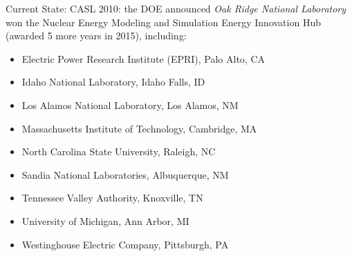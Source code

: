 \documentclass[xcolor=x11names]{beamer}
\begin{document}
%
%


\begin{frame}{Current State: CASL}
2010: the DOE announced \emph{Oak Ridge National Laboratory} won the Nuclear Energy Modeling and Simulation Energy Innovation Hub (awarded 5 more years in 2015), including:	
\begin{itemize}
\item Electric Power Research Institute (EPRI), Palo Alto, CA
\item Idaho National Laboratory, Idaho Falls, ID
\item Los Alamos National Laboratory, Los Alamos, NM
\item Massachusetts Institute of Technology, Cambridge, MA
\item North Carolina State University, Raleigh, NC
\item Sandia National Laboratories, Albuquerque, NM
\item Tennessee Valley Authority, Knoxville, TN
\item University of Michigan, Ann Arbor, MI
\item Westinghouse Electric Company, Pittsburgh, PA
\end{itemize}
\end{frame}
\end{document}
